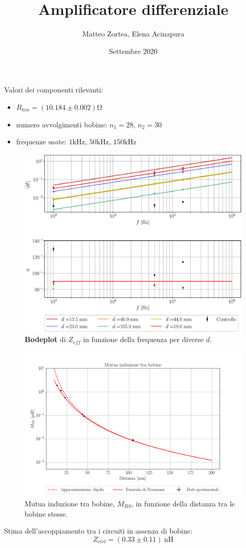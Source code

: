 \documentclass{article}
\title{Amplificatore differenziale}
\date{Settembre 2020}
\author{Matteo Zortea, Elena Acinapura}
\begin{document}
\maketitle
Valori dei componenti rilevanti:
\begin{itemize}
    \item $R_{lim} = (10.184\pm0.002) \si{\ohm}$
    \item numero avvolgimenti bobine: $n_1 = 28$, $n_2 = 30$
    \item frequenze usate: $1\si{\kilo\hertz}$, $50\si{\kilo\hertz}$, $150\si{\kilo\hertz}$
\end{itemize}

\begin{figure}[h!]
    \centering
    \includegraphics[scale = 0.55]{Grafici/bode.eps}
    \caption{\textbf{Bodeplot} di $Z_{eff}$ in funzione della frequenza per diverse $d$.}
    \label{fig:bode}
\end{figure}

\begin{figure}[h!]
    \centering
    \includegraphics[scale = 0.55]{Grafici/induttanza2.png}
    \caption{Mutua induzione tra bobine, $M_{RS}$, in funzione della distanza tra le bobine stesse.}
    \label{fig:induzione}
\end{figure}
Stima dell'accoppiamento tra i circuiti in assenza di bobine:
$$ Z_{ctrl} = (0.33\pm0.11)~\si{\nano\henry}$$
\end{document}
